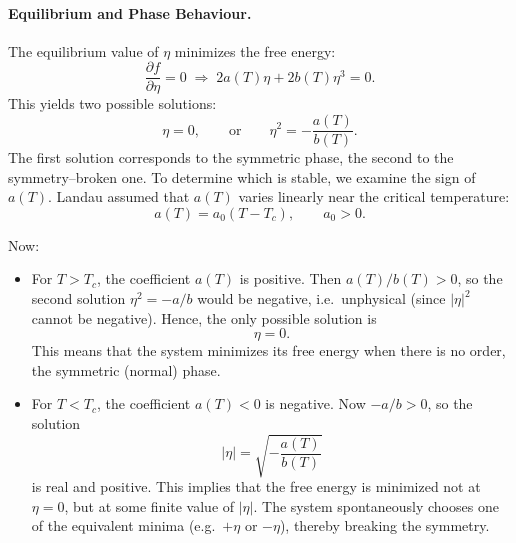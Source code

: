 \paragraph{Equilibrium and Phase Behaviour.}
The equilibrium value of \(\eta\) minimizes the free energy:
\[
\frac{\partial f}{\partial \eta} = 0
\;\Rightarrow\;
2a(T)\eta + 2b(T)\eta^3 = 0.
\]
This yields two possible solutions:
\[
\eta = 0, \qquad \text{or} \qquad \eta^2 = -\frac{a(T)}{b(T)}.
\]
The first solution corresponds to the symmetric phase, the second to the symmetry--broken one.  
To determine which is stable, we examine the sign of \(a(T)\).  
Landau assumed that \(a(T)\) varies linearly near the critical temperature:
\[
a(T) = a_0 (T - T_c), \qquad a_0 > 0.
\]

Now:

\begin{itemize}
    \item For \(T > T_c\), the coefficient \(a(T) \) is positive. Then \(a(T)/b(T) > 0\), so the second solution \(\eta^2 = -a/b\) would be negative, i.e.\ unphysical (since \(|\eta|^2\) cannot be negative).  
    Hence, the only possible solution is
    \[
    \eta = 0.
    \]
    This means that the system minimizes its free energy when there is no order, the symmetric (normal) phase.

    \item For \(T < T_c\), the coefficient \(a(T) < 0\) is negative. Now \(-a/b > 0\), so the solution
    \[
    |\eta| = \sqrt{-\frac{a(T)}{b(T)}}
    \]
    is real and positive.  
    This implies that the free energy is minimized not at \(\eta = 0\), but at some finite value of \(|\eta|\).  
    The system spontaneously chooses one of the equivalent minima (e.g.\ \(+\eta\) or \(-\eta\)), thereby breaking the symmetry.
\end{itemize}

